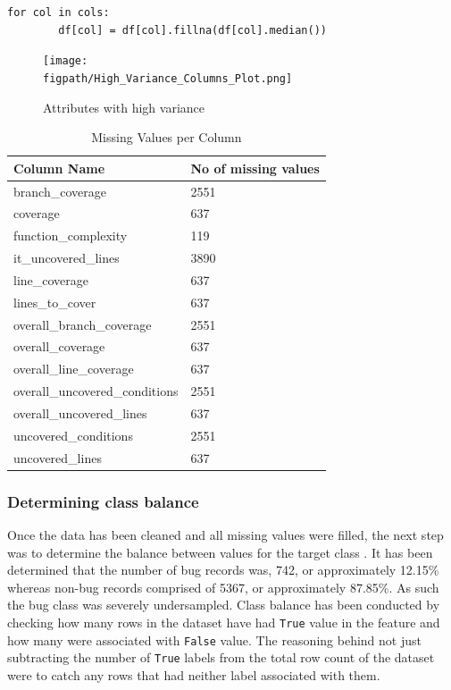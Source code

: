 \begin{code}
\label{code:missing-values-median-code}
\begin{verbatim}
for col in cols:
        df[col] = df[col].fillna(df[col].median())
\end{verbatim}
\end{code}

\begin{figure}[!h]
    \centering
    \texttt{[image: \\figpath/High\_Variance\_Columns\_Plot.png]}
    \caption{Attributes with high variance}
    \label{fig:high-variance}
\end{figure}

\begin{table}[!h]
\centering
\caption{Missing Values per Column}
\label{tbl:missing-values-per-col}
\begin{tabular}{@{}ll@{}}
\toprule
Column Name & No of missing values \\ \midrule
branch\_coverage & 2551 \\
coverage & 637 \\
function\_complexity & 119 \\
it\_uncovered\_lines & 3890 \\
line\_coverage & 637 \\
lines\_to\_cover & 637 \\
overall\_branch\_coverage & 2551 \\
overall\_coverage & 637 \\
overall\_line\_coverage & 637 \\
overall\_uncovered\_conditions & 2551 \\
overall\_uncovered\_lines & 637 \\
uncovered\_conditions & 2551 \\
uncovered\_lines & 637 \\ \bottomrule
\end{tabular}
\end{table}
\FloatBarrier

\subsubsection{Determining class balance} \label{sec:impl-data-analysis:class-balance}
Once the data has been cleaned and all missing values were filled, the next step was to determine the balance between values for the target class \isBug{}. It has been determined that the number of bug records was, 742, or approximately 12.15\% whereas non-bug records comprised of 5367, or approximately 87.85\%. As such the bug class was severely undersampled. Class balance has been conducted by checking how many rows in the dataset have had \texttt{True} value in the \isBug{} feature and how many were associated with \texttt{False} value. The reasoning behind not just subtracting the number of \texttt{True} labels from the total row count of the dataset were to catch any rows that had neither label associated with them. 

